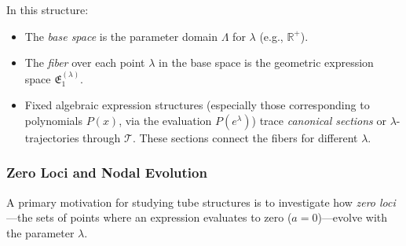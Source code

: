 In this structure:
\begin{itemize}
    \item The \emph{base space} is the parameter domain $\Lambda$ for $\lambda$ (e.g., $\mathbb{R}^+$).
    \item The \emph{fiber} over each point $\lambda$ in the base space is the geometric expression space $\mathfrak{E}_1^{(\lambda)}$.
    \item Fixed algebraic expression structures (especially those corresponding to polynomials $P(x)$, via the evaluation $P(e^\lambda)$) trace \emph{canonical sections} or $\lambda$-trajectories through $\mathcal{T}$. These sections connect the fibers for different $\lambda$.
\end{itemize}

\subsubsection{Zero Loci and Nodal Evolution}\label{subsec:tube_zeros}

A primary motivation for studying tube structures is to investigate how \emph{zero loci}—the sets of points where an expression evaluates to zero ($a=0$)—evolve with the parameter $\lambda$.

